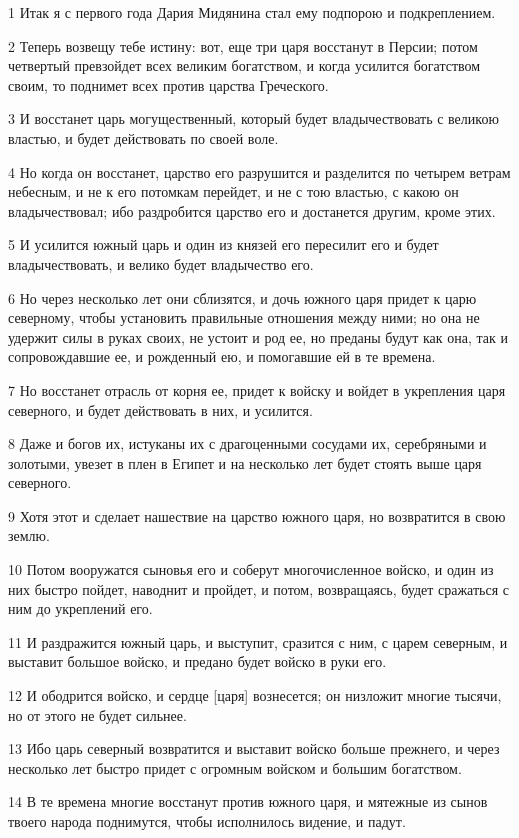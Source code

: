 \par 1 Итак я с первого года Дария Мидянина стал ему подпорою и подкреплением.
\par 2 Теперь возвещу тебе истину: вот, еще три царя восстанут в Персии; потом четвертый превзойдет всех великим богатством, и когда усилится богатством своим, то поднимет всех против царства Греческого.
\par 3 И восстанет царь могущественный, который будет владычествовать с великою властью, и будет действовать по своей воле.
\par 4 Но когда он восстанет, царство его разрушится и разделится по четырем ветрам небесным, и не к его потомкам перейдет, и не с тою властью, с какою он владычествовал; ибо раздробится царство его и достанется другим, кроме этих.
\par 5 И усилится южный царь и один из князей его пересилит его и будет владычествовать, и велико будет владычество его.
\par 6 Но через несколько лет они сблизятся, и дочь южного царя придет к царю северному, чтобы установить правильные отношения между ними; но она не удержит силы в руках своих, не устоит и род ее, но преданы будут как она, так и сопровождавшие ее, и рожденный ею, и помогавшие ей в те времена.
\par 7 Но восстанет отрасль от корня ее, придет к войску и войдет в укрепления царя северного, и будет действовать в них, и усилится.
\par 8 Даже и богов их, истуканы их с драгоценными сосудами их, серебряными и золотыми, увезет в плен в Египет и на несколько лет будет стоять выше царя северного.
\par 9 Хотя этот и сделает нашествие на царство южного царя, но возвратится в свою землю.
\par 10 Потом вооружатся сыновья его и соберут многочисленное войско, и один из них быстро пойдет, наводнит и пройдет, и потом, возвращаясь, будет сражаться с ним до укреплений его.
\par 11 И раздражится южный царь, и выступит, сразится с ним, с царем северным, и выставит большое войско, и предано будет войско в руки его.
\par 12 И ободрится войско, и сердце [царя] вознесется; он низложит многие тысячи, но от этого не будет сильнее.
\par 13 Ибо царь северный возвратится и выставит войско больше прежнего, и через несколько лет быстро придет с огромным войском и большим богатством.
\par 14 В те времена многие восстанут против южного царя, и мятежные из сынов твоего народа поднимутся, чтобы исполнилось видение, и падут.
